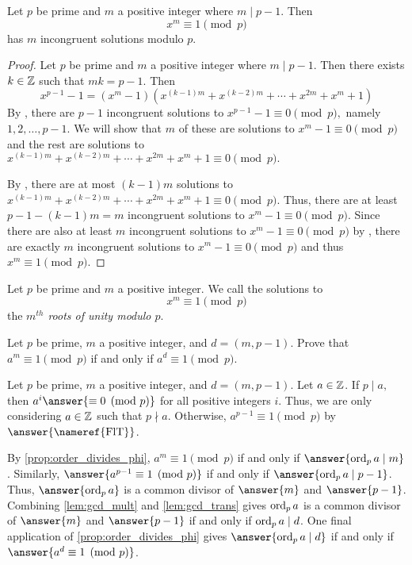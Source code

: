 \documentclass{ximera}
\begin{document}
\begin{proposition}\label{prop:roots-unity}
    Let $p$ be prime and $m$ a positive integer where $m\mid p-1$. Then 
    \[
        x^m\equiv 1\pmod{p}
    \]
    has $m$ incongruent solutions modulo $p.$

    \begin{proof}
        Let $p$ be prime and $m$ a positive integer where $m\mid p-1$. Then there exists $k\in\mathbb Z$ such that $mk=p-1.$
        Then 
        \[
            x^{p-1}-1=(x^m-1)(x^{(k-1)m}+x^{(k-2)m}+\cdots+x^{2m}+x^m+1)
        \]
        By , there are $p-1$ incongruent solutions to $x^{p-1}-1\equiv0\pmod{p},$ namely $1,2,\dots,p-1.$ We will show that $m$ of these are solutions to 
        $x^m-1\equiv 0\pmod{p}$ and the rest are solutions to $x^{(k-1)m}+x^{(k-2)m}+\cdots+x^{2m}+x^m+1\equiv 0\pmod{p}.$

        By , there are at most $(k-1)m$ solutions to $x^{(k-1)m}+x^{(k-2)m}+\cdots+x^{2m}+x^m+1\equiv 0\pmod{p}.$ Thus, there are at least $p-1-(k-1)m=m$ incongruent solutions to $x^m-1\equiv 0\pmod{p}.$ 
        Since there are also at least $m$ incongruent solutions to $x^m-1\equiv 0\pmod{p}$ by , there are exactly $m$ incongruent solutions to $x^m-1\equiv 0\pmod{p}$ and thus $x^m\equiv 1\pmod{p}.$
    \end{proof}
\end{proposition}

\begin{definition}\label{def:root-unity}
    
    Let $p$ be prime and $m$ a positive integer. We call the solutions to  
        \[x^m\equiv 1\pmod{p}\]
    the \emph{$m^{th}$ roots of unity modulo $p.$}
\end{definition}


\begin{br}\label{br:condition-root-unity}
    Let $p$ be prime, $m$ a positive integer, and $d=(m,p-1).$ Prove that $a^m\equiv 1\pmod{p}$ if and only if $a^d\equiv 1\pmod{p}.$


    \begin{solution}
        Let $p$ be prime, $m$ a positive integer, and $d=(m,p-1).$ Let $a\in\mathbb Z$. If $p\mid a,$ then $a^i\answer{\equiv 0\pmod{p}}$ for all positive integers $i$. 
        Thus, we are only considering $a\in\mathbb Z$ such that $p\nmid a.$
        Otherwise, $a^{p-1}\equiv 1\pmod{p}$ by $\answer{\textnormal{\nameref{FlT}}}$.
        
        By \cref{prop:order_divides_phi}, $a^m\equiv 1\pmod{p}$ if and only if $\answer{\ord_p a \mid m}$. Similarly, $\answer{a^{p-1}\equiv 1\pmod{p}}$ if and only if $\answer{\ord_p a \mid p-1}$. Thus, $\answer{\ord_p a}$ is a common divisor of $\answer{m}$ and $\answer{p-1}$. Combining \cref{lem:gcd_mult} and \cref{lem:gcd_trans} gives $\operatorname{ord}_p a$ is a common divisor of   $\answer{m}$ and $\answer{p-1}$ if and only if $\operatorname{ord}_p a\mid d$. One final application of \cref{prop:order_divides_phi} gives $\answer{\ord_p a\mid d}$ if and only if $\answer{a^d\equiv 1\pmod{p}}$.
    \end{solution}
\end{br}
\end{document}
